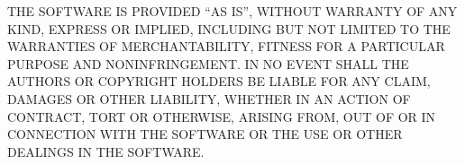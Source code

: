 T\+HE S\+O\+F\+T\+W\+A\+RE IS P\+R\+O\+V\+I\+D\+ED “\+AS I\+S”, W\+I\+T\+H\+O\+UT W\+A\+R\+R\+A\+N\+TY OF A\+NY K\+I\+ND, E\+X\+P\+R\+E\+SS OR I\+M\+P\+L\+I\+ED, I\+N\+C\+L\+U\+D\+I\+NG B\+UT N\+OT L\+I\+M\+I\+T\+ED TO T\+HE W\+A\+R\+R\+A\+N\+T\+I\+ES OF M\+E\+R\+C\+H\+A\+N\+T\+A\+B\+I\+L\+I\+TY, F\+I\+T\+N\+E\+SS F\+OR A P\+A\+R\+T\+I\+C\+U\+L\+AR P\+U\+R\+P\+O\+SE A\+ND N\+O\+N\+I\+N\+F\+R\+I\+N\+G\+E\+M\+E\+NT. IN NO E\+V\+E\+NT S\+H\+A\+LL T\+HE A\+U\+T\+H\+O\+RS OR C\+O\+P\+Y\+R\+I\+G\+HT H\+O\+L\+D\+E\+RS BE L\+I\+A\+B\+LE F\+OR A\+NY C\+L\+A\+IM, D\+A\+M\+A\+G\+ES OR O\+T\+H\+ER L\+I\+A\+B\+I\+L\+I\+TY, W\+H\+E\+T\+H\+ER IN AN A\+C\+T\+I\+ON OF C\+O\+N\+T\+R\+A\+CT, T\+O\+RT OR O\+T\+H\+E\+R\+W\+I\+SE, A\+R\+I\+S\+I\+NG F\+R\+OM, O\+UT OF OR IN C\+O\+N\+N\+E\+C\+T\+I\+ON W\+I\+TH T\+HE S\+O\+F\+T\+W\+A\+RE OR T\+HE U\+SE OR O\+T\+H\+ER D\+E\+A\+L\+I\+N\+GS IN T\+HE S\+O\+F\+T\+W\+A\+RE. 